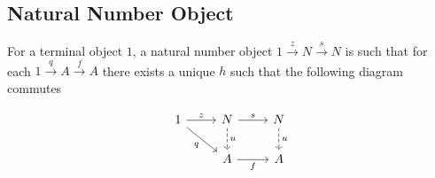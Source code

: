 \subsection{Natural Number Object}
\begin{definition}
	For a terminal object $1$, a natural number object
	$1\overset{z}{\to}N\overset{s}{\to}N$ is such that for each
	$1\overset{q}{\to}A\overset{f}{\to}A$ there exists a unique $h$ such that the
	following diagram commutes \parencite{awodey:category_theory}

	\[\begin{tikzcd}
		1 & N & N \\
		& A & A
		\arrow["z", from=1-1, to=1-2]
		\arrow["q"', from=1-1, to=2-2]
		\arrow["s", from=1-2, to=1-3]
		\arrow["f"', from=2-2, to=2-3]
		\arrow["u", dashed, from=1-2, to=2-2]
		\arrow["u", dashed, from=1-3, to=2-3]
	\end{tikzcd}\]
\end{definition}

